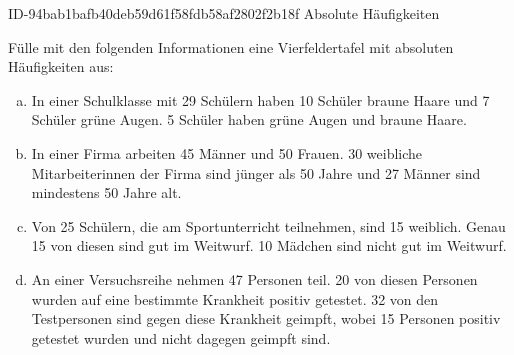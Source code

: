 \begin{exercise}
      {ID-94bab1bafb40deb59d61f58fdb58af2802f2b18f}
      {Absolute Häufigkeiten}
  \ifproblem\problem\par
    Fülle mit den folgenden Informationen eine Vierfeldertafel mit
    absoluten Häufigkeiten aus:
    \begin{enumerate}[a)]
      \item In einer Schulklasse mit \num{29} Schülern haben \num{10} Schüler braune Haare
            und \num{7} Schüler grüne Augen. \num{5} Schüler haben grüne Augen und braune Haare.
      \item In einer Firma arbeiten \num{45} Männer und \num{50} Frauen. \num{30} weibliche
            Mitarbeiterinnen der Firma sind jünger als \num{50} Jahre und \num{27} Männer sind
            mindestens \num{50} Jahre alt.
      \item Von \num{25} Schülern, die am Sportunterricht teilnehmen, sind \num{15} weiblich.
            Genau \num{15} von diesen sind gut im Weitwurf.
            \num{10} Mädchen sind nicht gut im Weitwurf.
      \item An einer Versuchsreihe nehmen \num{47} Personen teil. \num{20} von diesen Personen
            wurden auf eine bestimmte Krankheit positiv getestet. \num{32} von den
            Testpersonen sind gegen diese Krankheit geimpft, wobei \num{15} Personen
            positiv getestet wurden und nicht dagegen geimpft sind.
    \end{enumerate}
  \fi
  \ifoutcome\outcome\par
    \begin{minipage}{0.41\linewidth}
      \begin{fofotab}%
      \end{fofotab}
    \end{minipage}%
    \begin{minipage}{0.58\linewidth}
      \begin{itemize}
        \renewcommand{\itemsep}{-1ex}%

\end{itemize}
\end{minipage}
\end{exercise}
